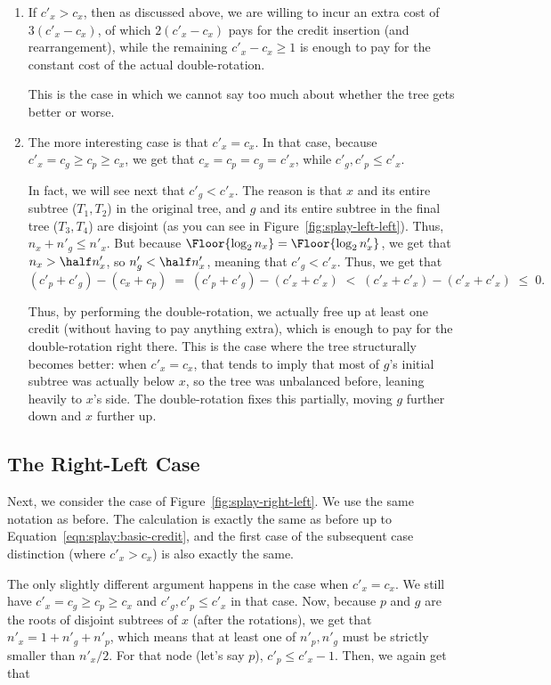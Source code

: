 \begin{enumerate}
\item If $c'_x > c_x$, then as discussed above, we are willing to
  incur an extra cost of $3(c'_x - c_x)$, of which $2(c'_x - c_x)$
  pays for the credit insertion (and rearrangement), while the
  remaining $c'_x - c_x \geq 1$ is enough to pay for the constant cost
  of the actual double-rotation.

  This is the case in which we cannot say too much about whether the
  tree gets better or worse.
\item The more interesting case is that $c'_x = c_x$. 
  In that case, because $c'_x = c_g \geq c_p \geq c_x$, we get that
  $c_x = c_p = c_g = c'_x$, while $c'_g, c'_p \leq c'_x$.

  In fact, we will see next that $c'_g < c'_x$. 
  The reason is that $x$ and its entire subtree ($T_1, T_2$) in the
  original tree, and $g$ and its entire subtree in the final tree
  ($T_3, T_4$) are disjoint 
  (as you can see in Figure~\ref{fig:splay-left-left}).
  Thus, $n_x + n'_g \leq n'_x$. 
  But because $\Floor{\log_2 n_x} = \Floor{\log_2 n'_x}$, we get that
  $n_x > \half n'_x$, so $n'_g < \half n'_x$, meaning that $c'_g < c'_x$.
  Thus, we get that 
\[ 
(c'_p + c'_g) - (c_x + c_p)
\; = \; (c'_p + c'_g) - (c'_x + c'_x)
\; < \; (c'_x + c'_x) - (c'_x + c'_x)
\; \leq \; 0.
\]

  Thus, by performing the double-rotation, we actually free up at
  least one credit (without having to pay anything extra), which is
  enough to pay for the double-rotation right there. 
  This is the case where the tree structurally becomes better: 
  when $c'_x = c_x$, that tends to 
  imply that most of $g$'s initial subtree was actually below $x$, so the tree
  was unbalanced before, leaning heavily to $x$'s side. The
  double-rotation fixes this partially, moving $g$ further down and
  $x$ further up.
\end{enumerate}

\subsection{The Right-Left Case}
Next, we consider the case of Figure~\ref{fig:splay-right-left}. 
We use the same notation as before. The calculation is exactly the
same as before up to Equation~\eqref{eqn:splay:basic-credit}, and the
first case of the subsequent case distinction (where $c'_x > c_x$) is
also exactly the same. 

The only slightly different argument happens in the case when $c'_x = c_x$.
We still have $c'_x = c_g \geq c_p \geq c_x$ and 
$c'_g, c'_p \leq c'_x$ in that case.
Now, because $p$ and $g$ are the roots of disjoint subtrees of $x$
(after the rotations), we get that $n'_x = 1 + n'_g + n'_p$, which
means that at least one of $n'_p, n'_g$ must be strictly smaller than
$n'_x/2$.
For that node (let's say $p$), $c'_p \leq c'_x - 1$. 
Then, we again get that

